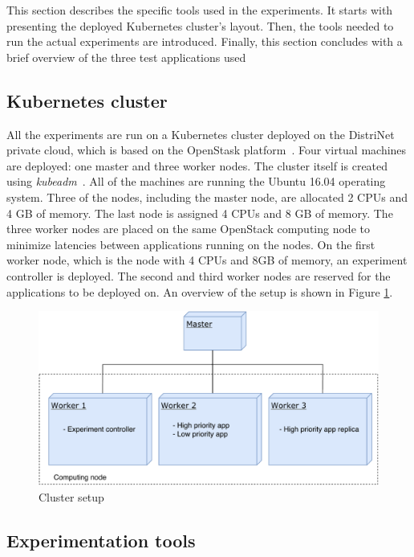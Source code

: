 This section describes the specific tools used in the experiments. It starts with presenting the deployed Kubernetes cluster's layout. Then, the tools needed to run the actual experiments are introduced. Finally, this section concludes with a brief overview of the three test applications used

\subsection{Kubernetes cluster}
\label{cluster}
All the experiments are run on a Kubernetes cluster deployed on the DistriNet private cloud, which is based on the OpenStask platform~\citep{openstack}. Four virtual machines are deployed: one master and three worker nodes. The cluster itself is created using \textit{kubeadm}~\citep{kubeadm}. All of the machines are running the Ubuntu 16.04 operating system. Three of the nodes, including the master node, are allocated 2 CPUs and 4 GB of memory. The last node is assigned 4 CPUs and 8 GB of memory. The three worker nodes are placed on the same OpenStack computing node to minimize latencies between applications running on the nodes. On the first worker node, which is the node with 4 CPUs and 8GB of memory, an experiment controller is deployed. The second and third worker nodes are reserved for the applications to be deployed on. An overview of the setup is shown in Figure \ref{fig:cluster}.

\begin{figure}
\centering
\includegraphics[width=0.75\columnwidth]{Images/Setup/Cluster.pdf}
\caption{Cluster setup}
\label{fig:cluster} 
\end{figure}


\subsection{Experimentation tools}
\label{tools}

